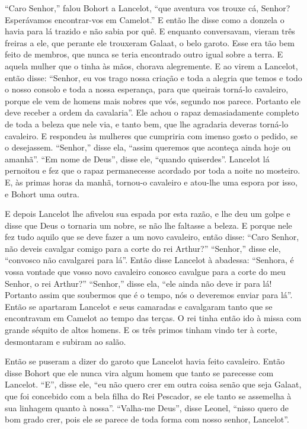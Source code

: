 “Caro Senhor,” falou Bohort a Lancelot, “que aventura vos trouxe cá, Senhor?
Esperávamos encontrar-vos em Camelot.” E então lhe disse como a donzela o havia
para lá trazido e não sabia por quê. E enquanto conversavam, vieram três
freiras a ele, que perante ele trouxeram Galaat, o belo garoto. Esse era tão
bem feito de membros, que nunca se teria encontrado outro igual sobre a terra.
E aquela mulher que o tinha às mãos, chorava alegremente. E ao virem a
Lancelot, então disse: “Senhor, eu vos trago nossa criação e toda a alegria
que temos e todo o nosso consolo e toda a nossa esperança, para que queirais
torná-lo cavaleiro, porque ele vem de homens mais nobres que vós, segundo nos
parece. Portanto ele deve receber a ordem da cavalaria”. Ele achou o rapaz
demasiadamente completo de toda a beleza que nele via, e tanto bem, que lhe
agradaria deveras torná-lo cavaleiro. E respondeu às mulheres que cumpriria com
imenso gosto o pedido, se o desejassem. “Senhor,” disse ela, “assim queremos
que aconteça ainda hoje ou amanhã”. “Em nome de Deus”, disse ele, “quando
quiserdes”. Lancelot lá pernoitou e fez que o rapaz permanecesse acordado por
toda a noite no mosteiro. E, às primas horas da manhã, tornou-o cavaleiro e
atou-lhe uma espora por isso, e Bohort uma outra.

E depois Lancelot lhe afivelou sua espada por esta razão, e lhe deu um golpe e
disse que Deus o tornaria um nobre, se não lhe faltasse a beleza. E porque nele
fez tudo aquilo que se deve fazer a um novo cavaleiro, então disse: “Caro
Senhor, não deveis cavalgar comigo para a corte do rei Arthur?”
“Senhor,” disse ele, “convosco não cavalgarei para lá”. Então disse Lancelot à
abadessa: “Senhora, é vossa vontade que vosso novo cavaleiro conosco cavalgue
para a corte do meu Senhor, o rei Arthur?” “Senhor,” disse ela, “ele ainda não
deve ir para lá! Portanto assim que soubermos que é o tempo, nós o deveremos
enviar para lá”. Então se apartaram Lancelot e seus camaradas e cavalgaram
tanto que se encontravam em Camelot ao tempo das terças. O rei tinha então ido à
missa com grande séquito de altos homens. E os três primos tinham vindo ter à
corte, desmontaram e subiram ao salão. 

Então se puseram a dizer do garoto que Lancelot havia feito cavaleiro. Então
disse Bohort que ele nunca vira algum homem que tanto se parecesse com
Lancelot. “E”, disse ele, “eu não quero crer em outra coisa senão que seja
Galaat, que foi concebido com a bela filha do Rei Pescador, se ele tanto se
assemelha à sua linhagem quanto à nossa”. “Valha-me Deus”, disse Leonel, “nisso
quero de bom grado crer, pois ele se parece de toda forma com nosso senhor, Lancelot”.

